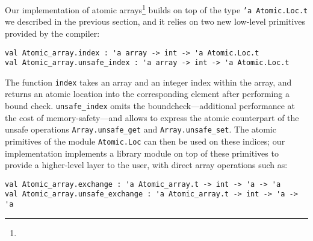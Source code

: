 Our implementation of atomic arrays\footnote{} builds on top of the type \texttt{'a Atomic.Loc.t} we described in the previous section, and it relies on two new low-level primitives provided by the compiler:

\begin{verbatim}
val Atomic_array.index : 'a array -> int -> 'a Atomic.Loc.t
val Atomic_array.unsafe_index : 'a array -> int -> 'a Atomic.Loc.t
\end{verbatim}

The function \texttt{index} takes an array and an integer index within the array, and returns an atomic location into the corresponding element after performing a bound check.
\texttt{unsafe_index} omits the boundcheck---additional performance at the cost of memory-safety---and allows to express the atomic counterpart of the unsafe operations \texttt{Array.unsafe_get} and \texttt{Array.unsafe_set}.
The atomic primitives of the module \texttt{Atomic.Loc} can then be used on these indices; our implementation implements a library module on top of these primitives to provide a higher-level layer to the user, with direct array operations such as:

\begin{verbatim}
val Atomic_array.exchange : 'a Atomic_array.t -> int -> 'a -> 'a
val Atomic_array.unsafe_exchange : 'a Atomic_array.t -> int -> 'a -> 'a
\end{verbatim}

